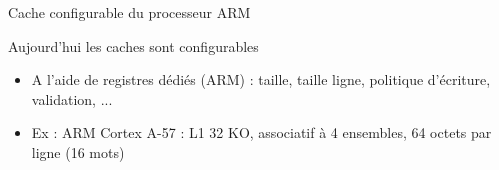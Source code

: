 %


\begin{Frame}{Cache configurable du processeur ARM}


      \begin{block}{Aujourd'hui les caches sont configurables}
       \begin{center}
     \begin{itemize}
         \item A l'aide de registres dédiés (ARM) : taille, taille ligne, politique d'écriture, validation, ...
         \item Ex : ARM Cortex A-57 : L1 32 KO, associatif à 4 ensembles, 64 octets par ligne (16 mots)
        \end{itemize}
       \end{center}
      \end{block}   

\vspace{-0,8cm}
        \begin{center}
        \end{center}


\end{Frame}


